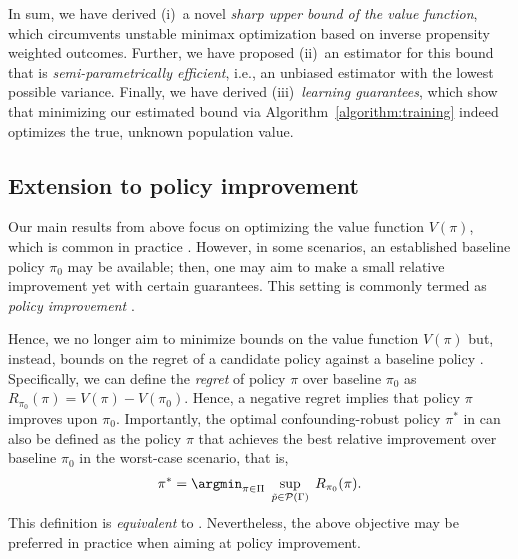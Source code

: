 \documentclass{article} %
\theoremstyle{plain}
\theoremstyle{definition}
\theoremstyle{remark}
\begin{document}
In sum, we have derived (i)~a novel \emph{sharp upper bound of the value function}, which circumvents unstable minimax optimization based on inverse propensity weighted outcomes. Further, we have proposed (ii)~an estimator for this bound that is \emph{semi-parametrically efficient}, i.e., an unbiased estimator with the lowest possible variance. Finally, we have derived (iii)~\emph{learning guarantees}, which show that minimizing our estimated bound via Algorithm~\ref{algorithm:training} indeed optimizes the true, unknown population value.

\subsection{Extension to policy improvement}\label{sec:extension_regret}

Our main results from above focus on optimizing the value function $V(\pi)$, which is common in practice \citep[e.g.,][]{Dudik.2011, Hatt.2022b}. However, in some scenarios, an established baseline policy $\pi_0$ may be available; then, one may aim to make a small relative improvement yet with certain guarantees. This setting is commonly termed as \emph{policy improvement} \citep{Kallus.2018c, Kallus.2021d, Laroche.2019,Thomas.2015}.

Hence, we no longer aim to minimize bounds on the value function $V(\pi)$ but, instead, bounds on the regret of a candidate policy against a baseline policy \citep{Kallus.2018c}. Specifically, we can define the \emph{regret} of policy $\pi$ over baseline $\pi_0$ as
    $R_{\pi_0}(\pi) = V(\pi) - V(\pi_0)$.
Hence, a negative regret implies that policy $\pi$ improves upon $\pi_0$. Importantly, the optimal confounding-robust policy $\pi^*$ in  can also be defined as the policy $\pi$ that achieves the best relative improvement over baseline $\pi_0$ in the worst-case scenario, that is,
\begin{align}\label{eq:minimax_regret}
 \pi^* = \argmin_{\pi \in \Pi} \; \sup_{\tilde{p} \in \mathcal{P}(\Gamma)} \;  R_{\pi_0}(\pi).
\end{align}
This definition is \emph{equivalent} to . Nevertheless, the above objective may be preferred in practice when aiming at policy improvement. 
\end{document}
